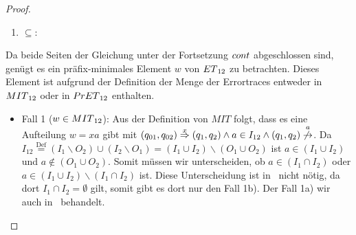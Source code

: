 \begin{proof}
  ~
  \begin{enumerate}
    \item \glqq $\subseteq$\grqq :
  \end{enumerate}
  Da beide Seiten der Gleichung unter der Fortsetzung $cont{}$ abgeschlossen sind, genügt es ein
  präfix-minimales Element $w$ von $ET{}_{12}$ zu betrachten. Dieses Element ist
  aufgrund der Definition der Menge der Errortraces entweder in $MIT{}_{12}$ oder in
  $PrET{}_{12}$ enthalten.\\
  \begin{itemize}
    \item Fall 1 ($w\in MIT{}_{12}$): Aus der Definition von $MIT$ folgt, dass es eine
  Aufteilung $w=xa$ gibt mit
  $(q_{01},q_{02})\overset{x}{\Rightarrow}(q_1,q_2)\wedge a\in I_{12}\wedge
  (q_1,q_2)\overset{a}{\not{\hspace{-0.1cm}\rightarrow}}$. Da
  $I_{12}\overset{\mathrm{Def}}{=}(I_1\backslash O_2)\cup (I_2\backslash O_1)=(I_1\cup
  I_2)\backslash (O_1\cup O_2)$ ist $a\in (I_1\cup I_2)$ und $a\notin (O_1\cup
  O_2)$. Somit müssen wir unterscheiden, ob $a\in (I_1\cap I_2)$ oder $a\in
  (I_1\cup I_2)\backslash (I_1\cap I_2)$ ist. Diese Unterscheidung ist
  in~\cite{Vogler2014EIO} nicht nötig, da dort $I_1\cap I_2=\emptyset$ gilt,
  somit gibt es dort nur den Fall 1b). Der Fall 1a) wir auch
  in~\cite{Schlosser2012BA} behandelt.
\end{itemize}
\end{proof}
